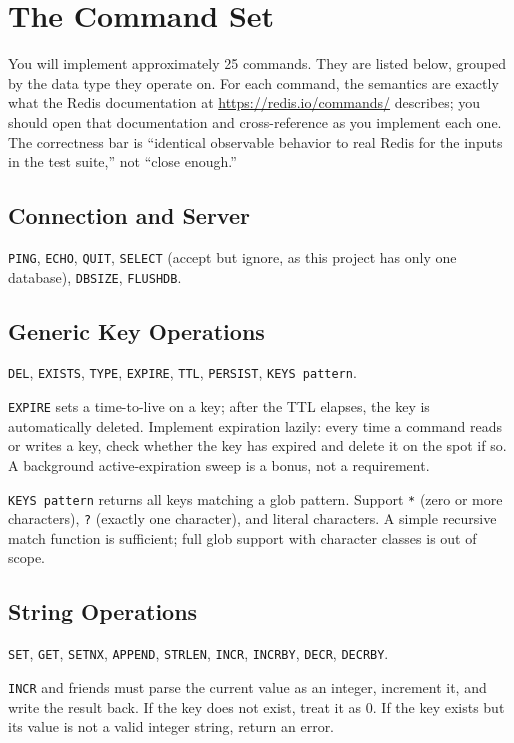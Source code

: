 \documentclass[11pt,a4paper]{article}
\begin{document}
\section{The Command Set}

You will implement approximately 25 commands. They are listed below, grouped by the data type they operate on. For each command, the semantics are exactly what the Redis documentation at \url{https://redis.io/commands/} describes; you should open that documentation and cross-reference as you implement each one. The correctness bar is ``identical observable behavior to real Redis for the inputs in the test suite,'' not ``close enough.''

\subsection{Connection and Server}
\texttt{PING}, \texttt{ECHO}, \texttt{QUIT}, \texttt{SELECT} (accept but ignore, as this project has only one database), \texttt{DBSIZE}, \texttt{FLUSHDB}.

\subsection{Generic Key Operations}
\texttt{DEL}, \texttt{EXISTS}, \texttt{TYPE}, \texttt{EXPIRE}, \texttt{TTL}, \texttt{PERSIST}, \texttt{KEYS pattern}.

\texttt{EXPIRE} sets a time-to-live on a key; after the TTL elapses, the key is automatically deleted. Implement expiration lazily: every time a command reads or writes a key, check whether the key has expired and delete it on the spot if so. A background active-expiration sweep is a bonus, not a requirement.

\texttt{KEYS pattern} returns all keys matching a glob pattern. Support \texttt{*} (zero or more characters), \texttt{?} (exactly one character), and literal characters. A simple recursive match function is sufficient; full glob support with character classes is out of scope.

\subsection{String Operations}
\texttt{SET}, \texttt{GET}, \texttt{SETNX}, \texttt{APPEND}, \texttt{STRLEN}, \texttt{INCR}, \texttt{INCRBY}, \texttt{DECR}, \texttt{DECRBY}.

\texttt{INCR} and friends must parse the current value as an integer, increment it, and write the result back. If the key does not exist, treat it as 0. If the key exists but its value is not a valid integer string, return an error.
\end{document}
